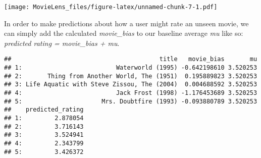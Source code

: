 \documentclass[
]{article}
\newenvironment{Shaded}{\begin{snugshade}}{\end{snugshade}}
\newcommand{\DataTypeTok}[1]{\textcolor[rgb]{0.13,0.29,0.53}{#1}}
\newcommand{\DecValTok}[1]{\textcolor[rgb]{0.00,0.00,0.81}{#1}}
\newcommand{\KeywordTok}[1]{\textcolor[rgb]{0.13,0.29,0.53}{\textbf{#1}}}
\newcommand{\NormalTok}[1]{#1}
\newcommand{\OperatorTok}[1]{\textcolor[rgb]{0.81,0.36,0.00}{\textbf{#1}}}
\newcommand{\StringTok}[1]{\textcolor[rgb]{0.31,0.60,0.02}{#1}}
\begin{document}
\begin{Shaded}
\end{Shaded}

\texttt{[image: MovieLens\_files/figure-latex/unnamed-chunk-7-1.pdf]}

In order to make predictions about how a user might rate an unseen
movie, we can simply add the calculated \emph{movie\_bias} to our
baseline average \emph{mu} like so: \emph{predicted rating = movie\_bias
+ mu}.

\begin{Shaded}
\end{Shaded}

\begin{verbatim}
##                                         title   movie_bias       mu
## 1:                          Waterworld (1995) -0.642198610 3.520253
## 2:       Thing from Another World, The (1951)  0.195889823 3.520253
## 3: Life Aquatic with Steve Zissou, The (2004)  0.004688592 3.520253
## 4:                          Jack Frost (1998) -1.176453689 3.520253
## 5:                      Mrs. Doubtfire (1993) -0.093880789 3.520253
##    predicted_rating
## 1:         2.878054
## 2:         3.716143
## 3:         3.524941
## 4:         2.343799
## 5:         3.426372
\end{verbatim}
\end{document}
